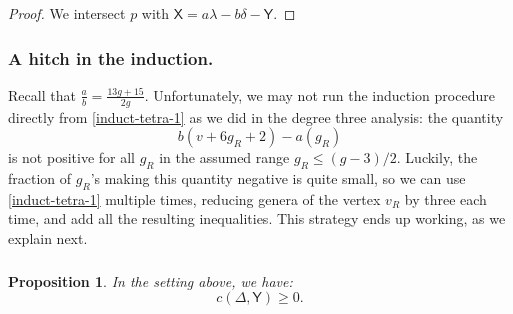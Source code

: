 \documentclass[reqno, 10 pt]{article}
\newtheorem{prop}[thm]{Proposition}
\theoremstyle{definition}
\theoremstyle{remark}
\numberwithin{equation}{section}
\numberwithin{thm}{section}
\numberwithin{prop}{section}
\numberwithin{lem}{section}
\numberwithin{cor}{section}
\numberwithin{conj}{section}
\numberwithin{defn}{section}
\newcommand{\sfY}{{\mathsf Y}}
\newcommand{\sfX}{{\mathsf X}}
\begin{document}
\begin{proof}
We intersect $p$ with $\sfX = a\lambda - b\delta - \sfY$.
\end{proof}

\subsubsection{A hitch in the induction.}
Recall that $\frac{a}{b} = \frac{13g+15}{2g}$.   Unfortunately, we may not run the induction procedure directly from \autoref{induct-tetra-1} as we did in the degree three analysis: the quantity \[b(v+6g_R +2) - a(g_R)\] is not positive for all $g_R$ in the assumed range $g_{R} \leq (g-3)/2$.  Luckily, the fraction of $g_R$'s making this quantity negative is quite small, so we can use \autoref{induct-tetra-1} multiple times, reducing genera of the vertex $v_{R}$ by three each time, and add all the resulting inequalities. This strategy ends up working, as we explain next. 

\subsubsection{}

\begin{prop}\label{tetr-ineq1}
In the setting above, we have: $$c(\Delta, \sfY) \geq 0.$$
\end{prop}
\end{document}
